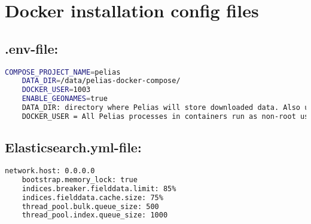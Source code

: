 \section{Docker installation config files} \label{Dicf}
\subsection{.env-file:}
\begin{lstlisting}[language=bash,breaklines=true]
	COMPOSE_PROJECT_NAME=pelias 
	DATA_DIR=/data/pelias-docker-compose/ 
	DOCKER_USER=1003 
	ENABLE_GEONAMES=true
	DATA_DIR: directory where Pelias will store downloaded data. Also used to build its other services. 
	DOCKER_USER = All Pelias processes in containers run as non-root users. This user ID will be used for accessing files on the host filesystem in DATA_DIR.
\end{lstlisting}

\subsection{Elasticsearch.yml-file:}
\begin{lstlisting}[language=bash,breaklines=true]
	network.host: 0.0.0.0 
	bootstrap.memory_lock: true 
	indices.breaker.fielddata.limit: 85% 
	indices.fielddata.cache.size: 75% 
	thread_pool.bulk.queue_size: 500 
	thread_pool.index.queue_size: 1000
\end{lstlisting}

